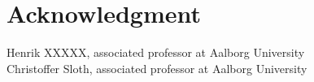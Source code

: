 \section*{Acknowledgment}
Henrik XXXXX, associated professor at Aalborg University \\
Christoffer Sloth, associated professor at Aalborg University




%
%




